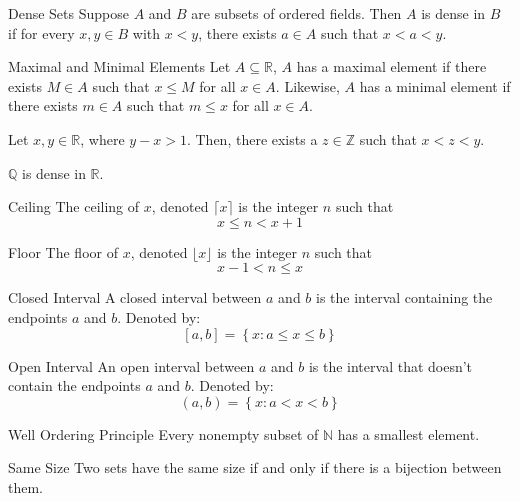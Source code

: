 \documentclass[12pt]{article}
\begin{document}
\begin{definition}{Dense Sets}{}
    Suppose $ A $ and $ B $ are subsets of ordered fields. Then $ A $ is dense in $ B $ if for every $ x,y \in B $ with $ x < y $, there exists $ a \in A $ such that $ x < a < y $.
\end{definition}
\begin{definition}{Maximal and Minimal Elements}{}
    Let $ A \subseteq \mathbb{R} $, $ A $ has a maximal element if there exists $ M \in A $ such that $ x \leq M $ for all $ x \in A $.
    \newline
    \medskip
    Likewise, $ A $ has a minimal element if there exists $ m \in A $ such that $ m \leq x $ for all $ x \in A $.
\end{definition}
\begin{lemma}{}{}
    Let $ x, y \in \mathbb{R} $, where $ y - x > 1 $. Then, there exists a $ z \in \mathbb{Z} $ such that $ x < z < y $.
\end{lemma}
\begin{theorem}{}{}
    $ \mathbb{Q} $ is dense in $ \mathbb{R} $.
\end{theorem}
\begin{definition}{Ceiling}{}
    The ceiling of $ x $, denoted $ \lceil x \rceil $ is the integer $ n $ such that
    \[ x \leq n < x + 1 \]
\end{definition}
\begin{definition}{Floor}{}
    The floor of $ x $, denoted $ \lfloor x \rfloor $ is the integer $ n $ such that
    \[ x - 1 < n \leq x \]
\end{definition}
\begin{definition}{Closed Interval}{}
    A closed interval between $ a $ and $ b $ is the interval containing the endpoints $ a $ and $ b $. Denoted by:
    \[ \left[ a, b \right] = \left\{ x : a \leq x \leq b \right\} \]
\end{definition}
\begin{definition}{Open Interval}{}
    An open interval between $ a $ and $ b $ is the interval that doesn't contain the endpoints $ a $ and $ b $. Denoted by:
    \[ \left( a, b \right) = \left\{ x : a < x < b \right\} \]
\end{definition}
\begin{definition}{Well Ordering Principle}{}
    Every nonempty subset of $ \mathbb{N} $ has a smallest element.
\end{definition}
\begin{definition}{Same Size}{}
    Two sets have the same size if and only if there is a bijection between them.
\end{definition}
\end{document}
